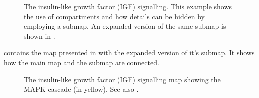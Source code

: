 \begin{figure}[htb]
\begin{center}
\caption{The insulin-like growth factor (IGF) signalling. This example shows the use of compartments and how details can be hidden by employing a submap.  An expanded version of the same submap is shown in .}\label{fig:insulin}
\end{center}
\end{figure}

 contains the map presented in  with the expanded version of it’s submap. It shows how the main map and the submap are connected.

\begin{figure}[htb]
\begin{center}
\caption{The insulin-like growth factor (IGF) signalling map showing the MAPK cascade (in yellow). See also .}\label{fig:mapk}
\end{center}
\end{figure}


